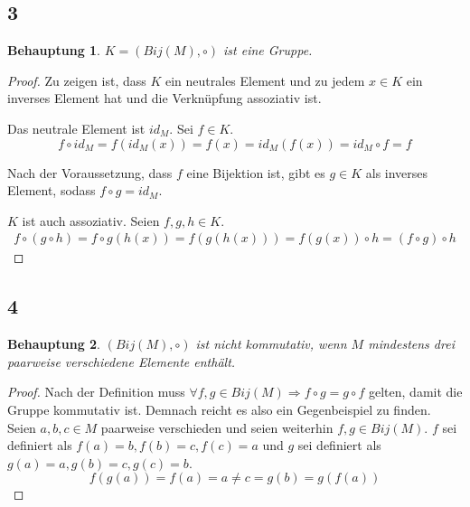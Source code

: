 \documentclass[a4paper,10pt]{article}
\newtheorem*{claim}{Behauptung}
\begin{document}
\subsection*{3}

\begin{claim}
 $K = (Bij(M), \circ)$ ist eine Gruppe.
\end{claim}

\begin{proof}
 Zu zeigen ist, dass $K$ ein neutrales Element und zu jedem $x \in K$ ein inverses Element hat und die Verknüpfung assoziativ ist.
 
 Das neutrale Element ist $id_M$.
 Sei $f \in K$.
 \begin{equation*}
  f \circ id_M = f(id_M(x)) = f(x) = id_M(f(x)) = id_M \circ f = f
 \end{equation*}

 Nach der Voraussetzung, dass $f$ eine Bijektion ist, gibt es $g \in K$ als inverses Element, sodass $f \circ g = id_M$.
 
 $K$ ist auch assoziativ.
 Seien $f, g, h \in K$.
 \begin{align*}
  f \circ (g \circ h) = f \circ g(h(x)) = f(g(h(x))) = f(g(x)) \circ h = (f \circ g) \circ h
 \end{align*}
\end{proof}

\subsection*{4}

\begin{claim}
 $(Bij(M), \circ)$ ist nicht kommutativ, wenn $M$ mindestens drei paarweise verschiedene Elemente enthält.
\end{claim}

\begin{proof}
 Nach der Definition muss $\forall f, g \in Bij(M) \Rightarrow f \circ g = g \circ f$ gelten, damit die Gruppe kommutativ ist.
 Demnach reicht es also ein Gegenbeispiel zu finden.
 Seien $a, b, c \in M$ paarweise verschieden und seien weiterhin $f, g \in Bij(M)$.
 $f$ sei definiert als $f(a) = b, f(b) = c, f(c) = a$ und $g$ sei definiert als $g(a) = a, g(b) = c, g(c) = b$.
 \begin{equation*}
  f(g(a)) = f(a) = a \ne c = g(b) = g(f(a))
 \end{equation*}
\end{proof}
\end{document}
